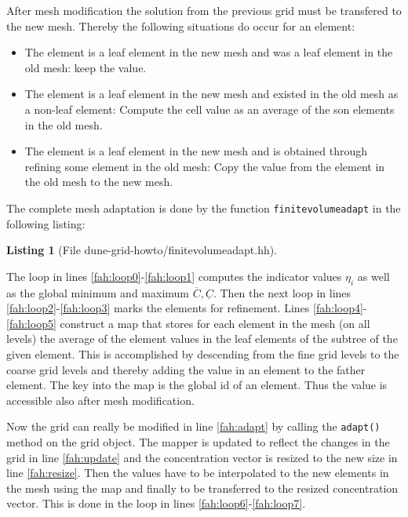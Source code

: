 \documentclass[11pt,a4paper,headinclude,footinclude,DIV16,headings=normal]{scrreprt}
\newtheorem{lst}{Listing}
\begin{document}
After mesh modification the solution from the previous grid must be
transfered to the new mesh. Thereby the following situations do occur
for an element:
\begin{itemize}
\item The element is a leaf element in the new mesh and was a leaf
  element in the old mesh: keep the value.
\item The element is a leaf element in the new mesh and existed in the
  old mesh as a non-leaf element: Compute the cell value as an average
  of the son elements in the old mesh.
\item The element is a leaf element in the new mesh and is obtained
  through refining some element in the old mesh: Copy the value
  from the element in the old mesh to the new mesh.
\end{itemize}

The complete mesh adaptation is done by the function
\lstinline!finitevolumeadapt! in the following listing:

\begin{lst}[File dune-grid-howto/finitevolumeadapt.hh] \mbox{}
\nopagebreak

\end{lst}

The loop in lines \ref{fah:loop0}-\ref{fah:loop1} computes the
indicator values $\eta_i$ as well as the global minimum and maximum
$\overline{C},\underline{C}$. Then the next loop in lines
\ref{fah:loop2}-\ref{fah:loop3} marks the elements for refinement.
Lines \ref{fah:loop4}-\ref{fah:loop5} construct a map that stores for
each element in the mesh (on all levels) the average of the element
values in the leaf elements of the subtree of the given element. This
is accomplished by descending from the fine grid levels to the coarse
grid levels and thereby adding the value in an element to the father
element. The key into the map is the global id of an element. Thus the
value is accessible also after mesh modification.

Now the grid can really be modified in line \ref{fah:adapt} by calling the
\lstinline!adapt()! method on the grid object. The mapper is updated
to reflect the changes in the grid in line \ref{fah:update} and the
concentration vector is resized to the new size in line
\ref{fah:resize}. Then the values have to be interpolated to the new
elements in the mesh using the map and finally to be transferred to
the resized concentration vector. This is done in the loop in lines
\ref{fah:loop6}-\ref{fah:loop7}.
\end{document}
